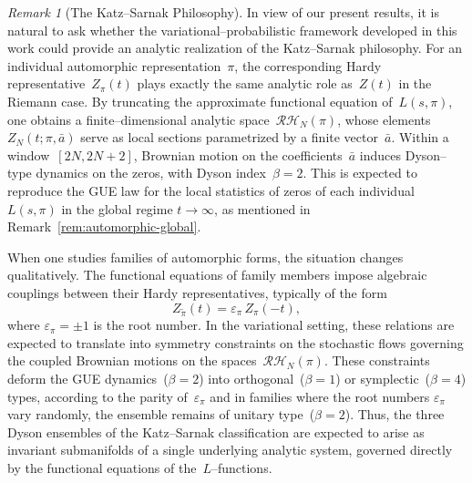 \documentclass[12pt,reqno]{amsart}
\theoremstyle{plain}
\theoremstyle{definition}
\theoremstyle{remark}
\newtheorem{rem}{Remark}[section]       %
\begin{document}
\begin{rem}[The Katz--Sarnak Philosophy]
In view of our present results, it is natural to ask whether the variational--probabilistic
framework developed in this work could provide an analytic realization
of the Katz--Sarnak philosophy.
For an individual automorphic representation~$\pi$,
the corresponding Hardy representative~$Z_\pi(t)$
plays exactly the same analytic role as~$Z(t)$ in the Riemann case.
By truncating the approximate functional equation of~$L(s,\pi)$,
one obtains a finite--dimensional analytic space~$\mathcal{RH}_N(\pi)$,
whose elements~$Z_N(t;\pi,\bar a)$ serve as local sections parametrized by a finite vector~$\bar a$.
Within a window~$[2N,2N+2]$,
Brownian motion on the coefficients~$\bar a$ induces Dyson--type dynamics on the zeros,
with Dyson index~$\beta=2$.
This is expected to reproduce the GUE law for the local statistics of zeros of each individual~$L(s,\pi)$
in the global regime $t\to\infty$, as mentioned in Remark~\ref{rem:automorphic-global}.

When one studies families of automorphic forms,
the situation changes qualitatively.
The functional equations of family members impose algebraic couplings between
their Hardy representatives,
typically of the form
\begin{equation}
Z_{\tilde{\pi}}(t) = \varepsilon_\pi\,Z_\pi(-t),
\end{equation}
where $\varepsilon_\pi=\pm1$ is the root number.
In the variational setting, these relations are expected to translate into symmetry constraints
on the stochastic flows governing the coupled Brownian motions
on the spaces~$\mathcal{RH}_N(\pi)$.
These constraints deform the GUE dynamics~($\beta=2$)
into orthogonal~($\beta=1$) or symplectic~($\beta=4$) types,
according to the parity of~$\varepsilon_\pi$ and in families where the root numbers $\varepsilon_\pi$ vary randomly,
the ensemble remains of unitary type~($\beta=2$).
Thus, the three Dyson ensembles of the Katz--Sarnak classification
are expected to arise as invariant submanifolds of a single underlying analytic system,
governed directly by the functional equations of the~$L$--functions.

\end{rem}
\end{document}
